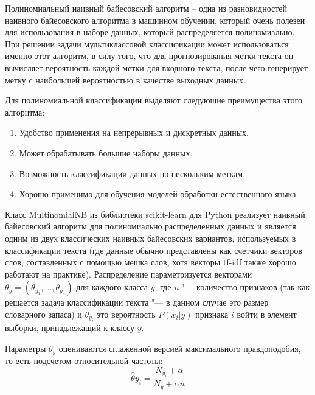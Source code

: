 \documentclass[bachelor, och, coursework]{SCWorks}
\begin{document}
            Полиномиальный наивный байесовский алгоритм – одна из разновидностей
            наивного байесовского алгоритма в машинном обучении, который очень
            полезен для использования в наборе данных, который распределяется
            полиномиально. При решении задачи мультиклассовой классификации
            может использоваться именно этот алгоритм, в силу того, что для
            прогнозирования метки текста он вычисляет вероятность каждой метки
            для входного текста, после чего генерирует метку с наибольшей
            вероятностью в качестве выходных данных.

            Для полиномиальной классификации выделяют следующие преимущества
            этого алгоритма:

                \begin{enumerate}
                    \item Удобство применения на непрерывных и дискретных
                    данных.
                    \item Может обрабатывать большие наборы данных.
                    \item Возможность классификации данных по нескольким меткам.
                    \item Хорошо применимо для обучения моделей обработки
                    естественного языка.
                \end{enumerate}

            Класс MultinomialNB из библиотеки scikit-learn для Python реализует
            наивный байесовский алгоритм для полиномиально распределенных данных
            и является одним из двух классических наивных байесовских вариантов,
            используемых в классификации текста (где данные обычно представлены
            как счетчики векторов слов, составленных с помощью мешка слов, хотя
            векторы tf-idf также хорошо работают на практике). Распределение
            параметризуется векторами $\theta_y = (\theta_{y_1}, \dots,
            \theta_{y_n})$ для каждого класса $y$, где $n$ "--- количество
            признаков (так как решается задача классификации текста "--- в
            данном случае это размер словарного запаса) и $\theta_{y_i}$ это
            вероятность $P(x_i | y)$ признака $i$ войти в элемент выборки,
            принадлежащий к классу $y$.

            Параметры $\theta_y$ оцениваются сглаженной версией максимального
            правдоподобия, то есть подсчетом относительной частоты:
            $$\hat{\theta}{y_i} = \frac{N_{y_i} + \alpha}{N_y + \alpha n}$$
\end{document}
